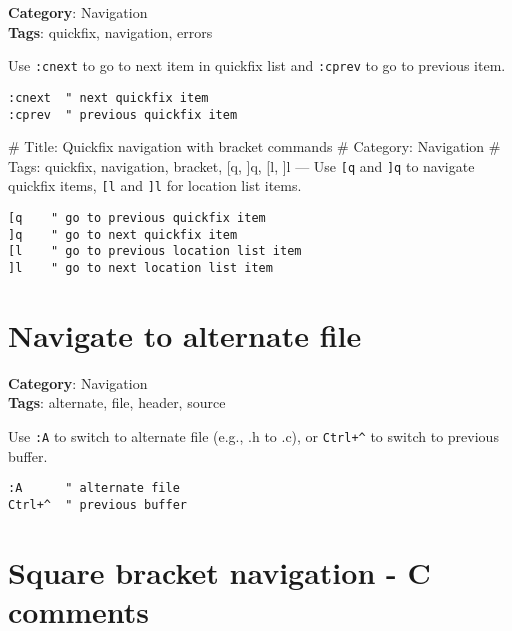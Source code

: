{{{{{{{{{\textbf{Category}: Navigation\\ \textbf{Tags}: quickfix, navigation, errors
\vspace{0.5cm}

Use {\footnotesize \Verb§:cnext§} to go to next item in quickfix list and {\footnotesize \Verb§:cprev§} to go to previous item.

\begin{Exa*}{}
\begin{Verbatim}[fontsize=\footnotesize, breaklines, breakanywhere]
:cnext  " next quickfix item
:cprev  " previous quickfix item
\end{Verbatim}
\end{Exa*}

\# Title: Quickfix navigation with bracket commands
\# Category: Navigation
\# Tags: quickfix, navigation, bracket, [q, ]q, [l, ]l
---
Use {\footnotesize \Verb§[q§} and {\footnotesize \Verb§]q§} to navigate quickfix items, {\footnotesize \Verb§[l§} and {\footnotesize \Verb§]l§} for location list items.

\begin{Exa*}{}
\begin{Verbatim}[fontsize=\footnotesize, breaklines, breakanywhere]
[q    " go to previous quickfix item
]q    " go to next quickfix item
[l    " go to previous location list item
]l    " go to next location list item
\end{Verbatim}
\end{Exa*}

\section{Navigate to alternate file}

\textbf{Category}: Navigation\\ \textbf{Tags}: alternate, file, header, source
\vspace{0.5cm}

Use {\footnotesize \Verb§:A§} to switch to alternate file (e.g., .h to .c), or {\footnotesize \Verb§Ctrl+^§} to switch to previous buffer.

\begin{Exa*}{}
\begin{Verbatim}[fontsize=\footnotesize, breaklines, breakanywhere]
:A      " alternate file
Ctrl+^  " previous buffer
\end{Verbatim}
\end{Exa*}

\section{Square bracket navigation - C comments}

}}}}}}}}}
